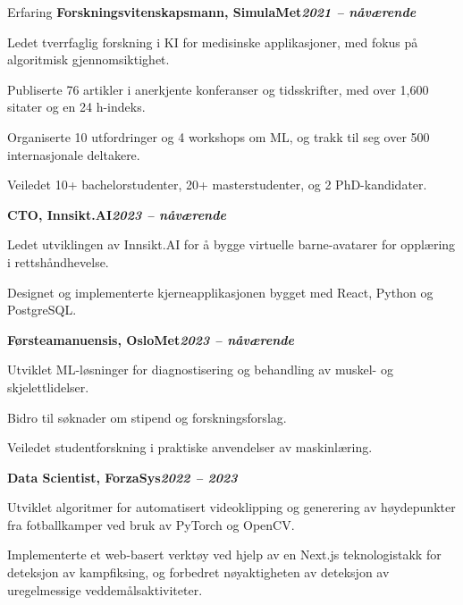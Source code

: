 \begin{rubric}{Erfaring}
%
\entry*[]%
\textbf{Forskningsvitenskapsmann, SimulaMet\hfill\textit{2021 -- nåværende}} \par
\begin{compactitem}
    \item Ledet tverrfaglig forskning i KI for medisinske applikasjoner, med fokus på algoritmisk gjennomsiktighet.
    \item Publiserte 76 artikler i anerkjente konferanser og tidsskrifter, med over 1,600 sitater og en 24 h-indeks.
    \item Organiserte 10 utfordringer og 4 workshops om ML, og trakk til seg over 500 internasjonale deltakere.
    \item Veiledet 10+ bachelorstudenter, 20+ masterstudenter, og 2 PhD-kandidater.
    \vspace{-12pt}
\end{compactitem}
%
\entry*[]%
\textbf{CTO, Innsikt.AI\hfill\textit{2023 -- nåværende}} \par
\begin{compactitem}
    \item Ledet utviklingen av Innsikt.AI for å bygge virtuelle barne-avatarer for opplæring i rettshåndhevelse.
    \item Designet og implementerte kjerneapplikasjonen bygget med React, Python og PostgreSQL.
    \vspace{-12pt}
\end{compactitem}
%
\entry*[]%
\textbf{Førsteamanuensis, OsloMet\hfill\textit{2023 -- nåværende}} \par
\begin{compactitem}
    \item Utviklet ML-løsninger for diagnostisering og behandling av muskel- og skjelettlidelser.
    \item Bidro til søknader om stipend og forskningsforslag.
    \item Veiledet studentforskning i praktiske anvendelser av maskinlæring.
    \vspace{-12pt}
\end{compactitem}
%
\entry*[]%
\textbf{Data Scientist, ForzaSys\hfill\textit{2022 -- 2023}} \par
\begin{compactitem}
    \item Utviklet algoritmer for automatisert videoklipping og generering av høydepunkter fra fotballkamper ved bruk av PyTorch og OpenCV.
    \item Implementerte et web-basert verktøy ved hjelp av en Next.js teknologistakk for deteksjon av kampfiksing, og forbedret nøyaktigheten av deteksjon av uregelmessige veddemålsaktiviteter.

\end{compactitem}
\end{rubric}
